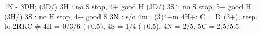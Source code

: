 1N - 3DH;
(3D/) 3H : no S stop, 4+ good H
(3D/) 3S*: no S stop, 5+ good H
(3H/) 3S : no H stop, 4+ good S
3N : s/o
4m : (3)4+m
4H+: C = D (3+), resp. to 2RKC  
# 4H = 0/3/6 (+0.5), 4S = 1/4 (+0.5), 4N = 2/5, 5C = 2.5/5.5